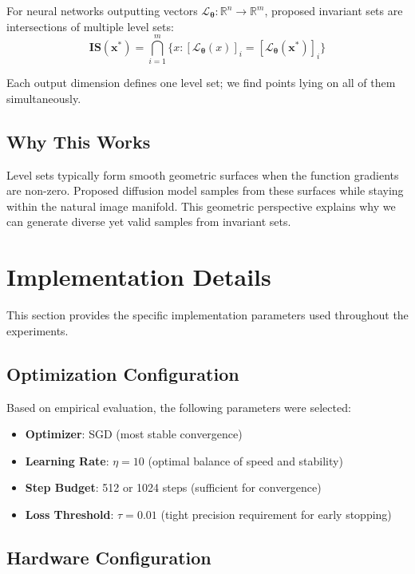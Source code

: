 \documentclass[licencjacka,en]{pracamgr}
\begin{document}
For neural networks outputting vectors $\mathcal{L}_{\boldsymbol{\theta}}: \mathbb{R}^n \rightarrow \mathbb{R}^m$, proposed invariant sets are intersections of multiple level sets:
\begin{equation}
\mathbf{IS}(\mathbf{x^*}) = \bigcap_{i=1}^m \{x : [\mathcal{L}_{\boldsymbol{\theta}}(x)]_i = [\mathcal{L}_{\boldsymbol{\theta}}(\mathbf{x^*})]_i\}
\end{equation}

Each output dimension defines one level set; we find points lying on all of them simultaneously.

\subsection{Why This Works}

Level sets typically form smooth geometric surfaces when the function gradients are non-zero. Proposed diffusion model samples from these surfaces while staying within the natural image manifold. This geometric perspective explains why we can generate diverse yet valid samples from invariant sets.

\section{Implementation Details}\label{appendix:implementation}

This section provides the specific implementation parameters used throughout the experiments.

\subsection{Optimization Configuration}

Based on empirical evaluation, the following parameters were selected:
\begin{itemize}
\item \textbf{Optimizer}: SGD (most stable convergence)
\item \textbf{Learning Rate}: $\eta = 10$ (optimal balance of speed and stability)
\item \textbf{Step Budget}: 512 or 1024 steps (sufficient for convergence)
\item \textbf{Loss Threshold}: $\tau = 0.01$ (tight precision requirement for early stopping)
\end{itemize}

\subsection{Hardware Configuration}
\end{document}
